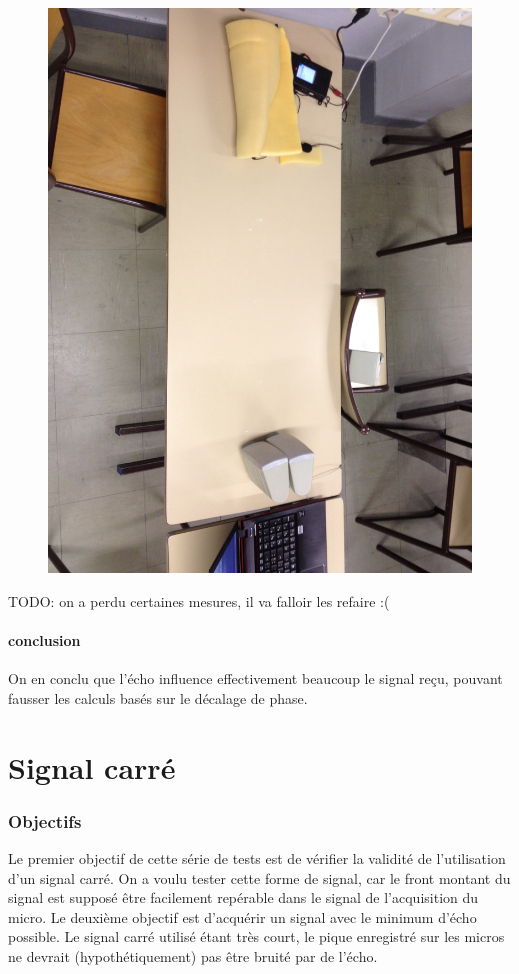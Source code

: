 \documentclass[12pt,a4paper]{article}
\begin{document}
\begin{figure}[H]
\includegraphics[width=\textwidth]{../donnees25-02/IMG_0924.jpg} 
\end{figure}

TODO: on a perdu certaines mesures, il va falloir les refaire :(

\subsection{conclusion}
On en conclu que l'écho influence effectivement beaucoup le signal reçu, pouvant fausser les calculs basés sur le décalage de phase.

\part{Signal carré}
\section{Objectifs}
	Le premier objectif de cette série de tests est de vérifier la validité de l'utilisation d'un signal carré.
	On a voulu tester cette forme de signal, car le front montant du signal est supposé être facilement repérable dans le signal de l'acquisition du micro.
	Le deuxième objectif est d'acquérir un signal avec le minimum d'écho possible. Le signal carré utilisé étant très court, le pique enregistré sur les micros ne devrait (hypothétiquement) pas être bruité par de l'écho.
\end{document}
